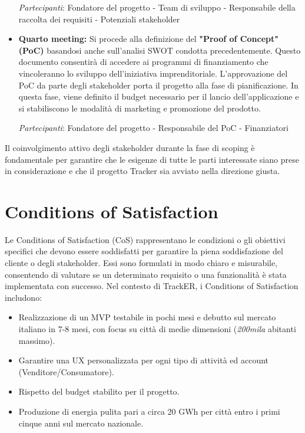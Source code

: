 \documentclass[oneside]{book}
\begin{document}
\begin{itemize}
\textit{Partecipanti}: Fondatore del progetto - Team di sviluppo - Responsabile della raccolta dei requisiti - Potenziali stakeholder

\item \textbf{Quarto meeting:} Si procede alla definizione del \textbf{"Proof of Concept" (PoC)} basandosi anche sull'analisi SWOT condotta precedentemente. \newline Questo documento consentirà di accedere ai programmi di finanziamento che vincoleranno lo sviluppo dell'iniziativa imprenditoriale. \newline L'approvazione del PoC da parte degli stakeholder porta il progetto alla fase di pianificazione. In questa fase, viene definito il budget necessario per il lancio dell'applicazione e si stabiliscono le modalità di marketing e promozione del prodotto.

\textit{Partecipanti}: Fondatore del progetto - Responsabile del PoC - Finanziatori

\end{itemize}

Il coinvolgimento attivo degli stakeholder durante la fase di scoping è fondamentale per garantire che le esigenze di tutte le parti interessate siano prese in considerazione e che il progetto Tracker sia avviato nella direzione giusta.

\clearpage
\section{Conditions of Satisfaction}

Le Conditions of Satisfaction (CoS) rappresentano le condizioni o gli obiettivi specifici che devono essere soddisfatti per garantire la piena soddisfazione del cliente o degli stakeholder. Essi sono formulati in modo chiaro e misurabile, consentendo di valutare se un determinato requisito o una funzionalità è stata implementata con successo.
\newline \newline Nel contesto di TrackER, i Conditions of Satisfaction includono:

\begin{itemize}
\item Realizzazione di un MVP testabile in pochi mesi e debutto sul mercato italiano in 7-8 mesi, con focus su città di medie dimensioni (\textit{200mila} abitanti massimo).

\item Garantire una UX personalizzata per ogni tipo di attività ed account (Venditore/Consumatore).

\item Rispetto del budget stabilito per il progetto.

\item Produzione di energia pulita pari a circa 20 GWh per città entro i primi cinque anni sul mercato nazionale.

\end{itemize}
\end{document}

